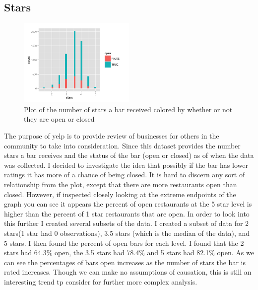 \documentclass[11pt]{article}
\begin{document}
\subsection{Stars}
\begin{figure}[h!]
  \caption{Plot of the number of stars a bar received colored by whether or not they are open or closed}
  \centering
  \label{open}
    \includegraphics[width=0.5\textwidth]{Figures/barstatus.png}
\end{figure}
The purpose of yelp is to provide review of businesses for others in the community to take into consideration.  Since this dataset provides the number stars a bar receives and the status of the bar (open or closed) as of when the data was collected.  I decided to investigate the idea that possibly if the bar has lower ratings it has more of a chance of being closed.  It is hard to discern any sort of relationship from the plot, except that there are more restaurants open than closed.  However, if inspected closely looking at the extreme endpoints of the graph you can see it appears the percent of open restaurants at the 5 star level is higher than the percent of 1 star restaurants that are open. In order to look into this further I created several subsets of the data.  I created a subset of data for 2 stars(1 star had 0 observations), 3.5 stars (which is the median of the data), and 5 stars.  I then found the percent of open bars for each level.  I found that the 2 stars had 64.3$\%$ open, the 3.5 stars had 78.4$\%$ and 5 stars had 82.1$\%$ open.  As we can see the percentages of bars open increases as the number of stars the bar is rated increases.  Though we can make no assumptions of causation, this is still an interesting trend tp consider for further more complex analysis.
\end{document}
